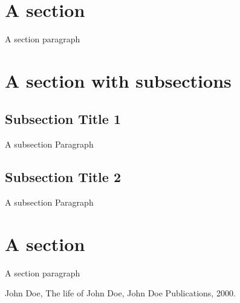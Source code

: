 \documentclass[12pt,a4paper,oneside]{book}
\renewcommand{\headrulewidth}{0pt}
\renewcommand{\headrulewidth}{0pt}
\begin{document}
\section*{A section}
\indent A section paragraph


\section*{A section with subsections}
\subsection*{Subsection Title 1}

\indent A subsection Paragraph


\subsection*{Subsection Title 2}

\indent A subsection Paragraph

\section*{A section}

\indent A section paragraph





\begin{thebibliography}{0}
\renewcommand{\headrulewidth}{0pt}
\fancyhead{}
\markboth{}{}{}

John Doe, The life of John Doe, John Doe Publications, 2000.

\end{thebibliography}
\pagebreak\centering\setlength{\parindent}{10pt}
\tableofcontents
{}
\end{document}
